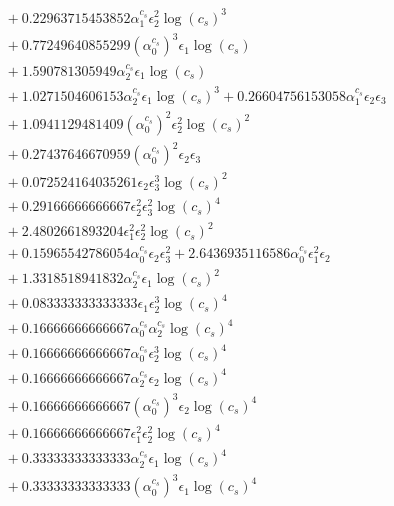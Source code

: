 \documentclass[10pt]{article}
\begin{document}
\begin{align*}
&{}  + 0.22963715453852 \alpha_{1}^{c_s} \epsilon_{2}^{2} \log{\left(c_{s} \right)}^{3} \\
&{}  + 0.77249640855299 \left(\alpha_{0}^{c_s}\right)^{3} \epsilon_{1} \log{\left(c_{s} \right)} \\
&{}  + 1.590781305949 \alpha_{2}^{c_s} \epsilon_{1} \log{\left(c_{s} \right)} \\
&{}  + 1.0271504606153 \alpha_{2}^{c_s} \epsilon_{1} \log{\left(c_{s} \right)}^{3} + 0.26604756153058 \alpha_{1}^{c_s} \epsilon_{2} \epsilon_{3} \\
&{}  + 1.0941129481409 \left(\alpha_{0}^{c_s}\right)^{2} \epsilon_{2}^{2} \log{\left(c_{s} \right)}^{2} \\
&{}  + 0.27437646670959 \left(\alpha_{0}^{c_s}\right)^{2} \epsilon_{2} \epsilon_{3} \\
&{}  + 0.072524164035261 \epsilon_{2} \epsilon_{3}^{3} \log{\left(c_{s} \right)}^{2} \\
&{}  + 0.29166666666667 \epsilon_{2}^{2} \epsilon_{3}^{2} \log{\left(c_{s} \right)}^{4} \\
&{}  + 2.4802661893204 \epsilon_{1}^{2} \epsilon_{2}^{2} \log{\left(c_{s} \right)}^{2} \\
&{}  + 0.15965542786054 \alpha_{0}^{c_s} \epsilon_{2} \epsilon_{3}^{2} + 2.6436935116586 \alpha_{0}^{c_s} \epsilon_{1}^{2} \epsilon_{2} \\
&{}  + 1.3318518941832 \alpha_{2}^{c_s} \epsilon_{1} \log{\left(c_{s} \right)}^{2} \\
&{}  + 0.083333333333333 \epsilon_{1} \epsilon_{2}^{3} \log{\left(c_{s} \right)}^{4} \\
&{}  + 0.16666666666667 \alpha_{0}^{c_s} \alpha_{2}^{c_s} \log{\left(c_{s} \right)}^{4} \\
&{}  + 0.16666666666667 \alpha_{0}^{c_s} \epsilon_{2}^{3} \log{\left(c_{s} \right)}^{4} \\
&{}  + 0.16666666666667 \alpha_{2}^{c_s} \epsilon_{2} \log{\left(c_{s} \right)}^{4} \\
&{}  + 0.16666666666667 \left(\alpha_{0}^{c_s}\right)^{3} \epsilon_{2} \log{\left(c_{s} \right)}^{4} \\
&{}  + 0.16666666666667 \epsilon_{1}^{2} \epsilon_{2}^{2} \log{\left(c_{s} \right)}^{4} \\
&{}  + 0.33333333333333 \alpha_{2}^{c_s} \epsilon_{1} \log{\left(c_{s} \right)}^{4} \\
&{}  + 0.33333333333333 \left(\alpha_{0}^{c_s}\right)^{3} \epsilon_{1} \log{\left(c_{s} \right)}^{4} \\

\end{align*}
\end{document}
